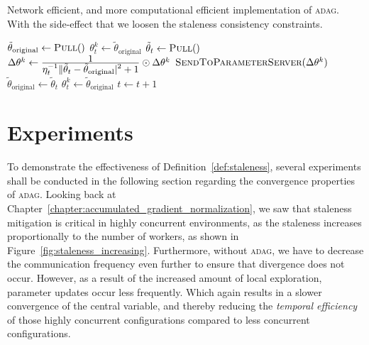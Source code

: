\begin{algorithm}[H]
  \caption{Network efficient, and more computational efficient implementation of \textsc{adag}. With the side-effect that we loosen the staleness consistency constraints.}
  \label{algo:adag_3}
  \begin{algorithmic}[1]
    \State $\tilde{\theta}_\text{original} \gets \Call{Pull}$ 
    \State $\theta^k_t \gets \tilde{\theta}_\text{original}$
    \State
     
    \State $\tilde{\theta}_t \gets \Call{Pull}$
    \State $\Delta\theta^k \gets \frac{\displaystyle 1}{\displaystyle \eta_t^{-1}\|\tilde{\theta}_t - \tilde{\theta}_\text{original}|^2 + 1} \odot \Delta\theta^k$
    \State $\Call{SendToParameterServer}{\Delta\theta^k}$
    \State $\tilde{\theta}_\text{original} \gets \tilde{\theta}_t$
    \State $\theta^k_t \gets \tilde{\theta}_\text{original}$
    \State $t \gets t + 1$
    \EndProcedure
    \State
    \EndProcedure
  \end{algorithmic}
\end{algorithm}

\section{Experiments}
\label{sec:adag_experiments}

To demonstrate the effectiveness of Definition~\ref{def:staleness}, several experiments shall be conducted in the following section regarding the convergence properties of \textsc{adag}. Looking back at Chapter~\ref{chapter:accumulated_gradient_normalization}, we saw that staleness mitigation is critical in highly concurrent environments, as the staleness increases proportionally to the number of workers, as shown in Figure~\ref{fig:staleness_increasing}. Furthermore, without \textsc{adag}, we have to decrease the communication frequency even further to ensure that divergence does not occur. However, as a result of the increased amount of local exploration, parameter updates occur less frequently. Which again results in a slower convergence of the central variable, and thereby reducing the \emph{temporal efficiency} of those highly concurrent configurations compared to less concurrent configurations.\\

